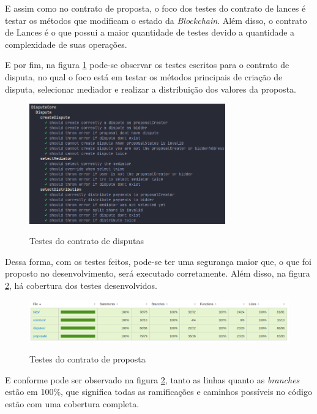 E assim como no contrato de proposta, o foco dos testes do contrato de lances é testar os métodos que modificam o estado da \textit{Blockchain}. Além disso, o contrato de Lances é o que possui a maior quantidade de testes devido a quantidade a complexidade de suas operações.

E por fim, na figura \ref{fig:tests_dispute_fig} pode-se observar os testes escritos para o contrato de disputa, no qual o foco está em testar os métodos principais de criação de disputa, selecionar mediador e realizar a distribuição dos valores da proposta.

\begin{figure}[!h]
  \centering
  \caption{Testes do contrato de disputas}
  \includegraphics[width=320px]{src/images/contracts/tests_dispute.png}
  \label{fig:tests_dispute_fig}
\end{figure}

Dessa forma, com os testes feitos, pode-se ter uma segurança maior que, o que foi proposto no desenvolvimento, será executado corretamente. Além disso, na figura \ref{fig:tests_coverage_fig}, há cobertura dos testes desenvolvidos.

\begin{figure}[!h]
  \centering
  \caption{Testes do contrato de proposta}
  \includegraphics[width=450px]{src/images/contracts/tests_coverage.png}
  \label{fig:tests_coverage_fig}
\end{figure}

E conforme pode ser observado na figura \ref{fig:tests_coverage_fig}, tanto as linhas quanto as \textit{branches} estão em 100\%, que significa todas as ramificações e caminhos possíveis no código estão com uma cobertura completa.

